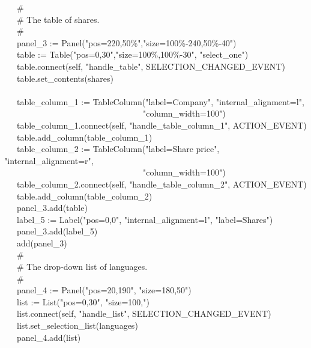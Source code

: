 {\>   \ \ \ \# \\
\>   \ \ \ \# The table of shares. \\
\>   \ \ \ \# \\
\>   \ \ \ panel\_3 :=
Panel("pos=220,50\%","size=100\%-240,50\%-40") \\
\>   \ \ \ table :=
Table("pos=0,30","size=100\%,100\%-30",
"select\_one") \\
\>   \ \ \ table.connect(self,
"handle\_table",
SELECTION\_CHANGED\_EVENT) \\
\>   \ \ \ table.set\_contents(shares) \\
\ \\
\>   \ \ \ table\_column\_1 :=
TableColumn("label=Company",
"internal\_alignment=l", \\
\>   \ \ \ \ \ \ \ \ \ \ \ \ \ \ \ \ \ \ \ \ \ \ \ \ \ \ \ \ \ \ \ \ \ "column\_width=100") \\
\>   \ \ \ table\_column\_1.connect(self,
"handle\_table\_column\_1", ACTION\_EVENT) \\
\>   \ \ \ table.add\_column(table\_column\_1) \\
\>   \ \ \ table\_column\_2 := TableColumn("label=Share
price",
"internal\_alignment=r", \\
\>   \ \ \ \ \ \ \ \ \ \ \ \ \ \ \ \ \ \ \ \ \ \ \ \ \ \ \ \ \ \ \ \ \ "column\_width=100") \\
\>   \ \ \ table\_column\_2.connect(self,
"handle\_table\_column\_2", ACTION\_EVENT) \\
\>   \ \ \ table.add\_column(table\_column\_2) \\
\>   \ \ \ panel\_3.add(table) \\
\>   \ \ \ label\_5 := Label("pos=0,0",
"internal\_alignment=l",
"label=Shares") \\
\>   \ \ \ panel\_3.add(label\_5) \\
\>   \ \ \ add(panel\_3) \\
\>   \ \ \ \# \\
\>   \ \ \ \# The drop-down list of languages. \\
\>   \ \ \ \# \\
\>   \ \ \ panel\_4 := Panel("pos=20,190",
"size=180,50") \\
\>   \ \ \ list := List("pos=0,30", "size=100,") \\
\>   \ \ \ list.connect(self,
"handle\_list", SELECTION\_CHANGED\_EVENT) \\
\>   \ \ \ list.set\_selection\_list(languages) \\
\>   \ \ \ panel\_4.add(list) \\
}
